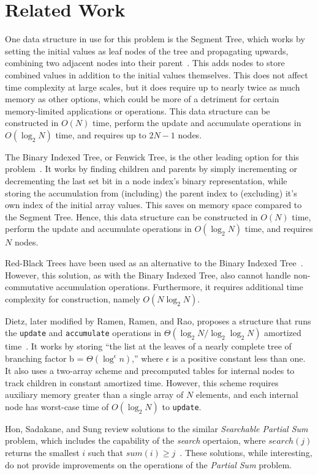 \section{Related Work}
One data structure in use for this problem is the Segment Tree, which works by setting the initial values as leaf nodes of the tree and propagating upwards, combining two adjacent nodes into their parent~\cite{deBerg2008}. 
This adds nodes to store combined values in addition to the initial values themselves.
This does not affect time complexity at large scales, but it does require up to nearly twice as much memory as other options, which could be more of a detriment for certain memory-limited applications or operations. 
This data structure can be constructed in $O(N)$ time, perform the update and accumulate operations in $O(\log_2 N)$ time, and requires up to $2N - 1$ nodes.

The Binary Indexed Tree, or Fenwick Tree, is the other leading option for this problem~\cite{Fenwick1994AND}. 
It works by finding children and parents by simply incrementing or decrementing the last set bit in a node index's binary representation, while storing the accumulation from (including) the parent index to (excluding) it's own index of the initial array values. 
This saves on memory space compared to the Segment Tree. 
Hence, this data structure can be constructed in $O(N)$ time, perform the update and accumulate operations in $O(\log_2 N)$ time, and requires $N$ nodes.

Red-Black Trees have been used as an alternative to the Binary Indexed Tree~\cite{cormen01introduction,accumulation_tree}.
However, this solution, as with the Binary Indexed Tree, also cannot handle non-commutative accumulation operations. Furthermore, it requires additional time complexity for construction, namely $O(N \log_2 N)$.

Dietz, later modified by Ramen, Ramen, and Rao, proposes a structure that runs the \texttt{update} and \texttt{accumulate} operations in $\Theta(\log_2 N / \log_2 \log_2 N)$ amortized time~\cite{Dietz1989OptimalAF,ramen-ramen-rao}. 
It works by storing ``the list at the leaves of a nearly complete tree of branching factor b = $\Theta(\log ^\epsilon n)$,'' where $\epsilon$ is a positive constant less than one. 
It also uses a two-array scheme and precomputed tables for internal nodes to track children in constant amortized time. 
However, this scheme requires auxiliary memory greater than a single array of $N$ elements, and each internal node has worst-case time of $O(\log_2 N)$ to \texttt{update}.

Hon, Sadakane, and Sung review solutions to the similar \textit{Searchable Partial Sum} problem, which includes the capability of the \textit{search} opertaion, where $search(j)$ returns the smallest $i$ such that $sum(i) \geq j$~\cite{10.1007/978-3-540-24587-2_52}. 
These solutions, while interesting, do not provide improvements on the operations of the \textit{Partial Sum} problem.